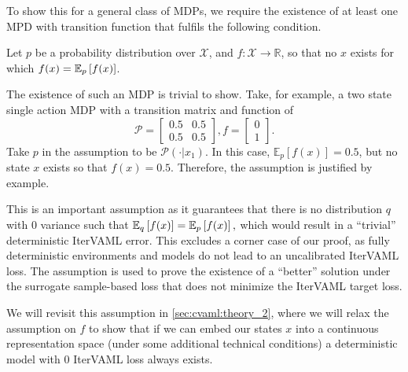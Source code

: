 To show this for a general class of MDPs, we require the existence of at least one MPD with transition function that fulfils the following condition.
\begin{assumption}\label{ass:cvaml_mdp}
Let $p$ be a probability distribution over $\mathcal{X}$, and $f: \mathcal{X} \rightarrow \mathbb{R}$, so that no $x$ exists for which $f(x) = \mathbb{E}_{p}\left[  f(x) \right]$.
\end{assumption}
The existence of such an MDP is trivial to show.
Take, for example, a two state single action MDP with a transition matrix and function of $$\mathcal{P}=\begin{bmatrix}
0.5 & 0.5\\
0.5 & 0.5 
\end{bmatrix}, f=\begin{bmatrix}
    0 \\
    1
\end{bmatrix}.$$
Take $p$ in the assumption to be $\mathcal{P}(\cdot|x_1)$. In this case, $\mathbb{E}_p[f(x)] = 0.5$, but no state $x$ exists so that $f(x) = 0.5.$
Therefore, the assumption is justified by example.

This is an important assumption as it guarantees that there is no distribution $q$ with $0$ variance such that $\mathbb{E}_{q}\left[  f(x) \right] = \mathbb{E}_{p}\left[  f(x) \right],$ which would result in a ``trivial'' deterministic IterVAML error.
This excludes a corner case of our proof, as fully deterministic environments and models do not lead to an uncalibrated IterVAML loss.
The assumption is used to prove the existence of a ``better'' solution under the surrogate sample-based loss that does not minimize the IterVAML target loss.

We will revisit this assumption in \autoref{sec:cvaml:theory_2}, where we will relax the assumption on $f$ to show that if we can embed our states $x$ into a continuous representation space (under some additional technical conditions) a deterministic model with 0 IterVAML loss always exists.

